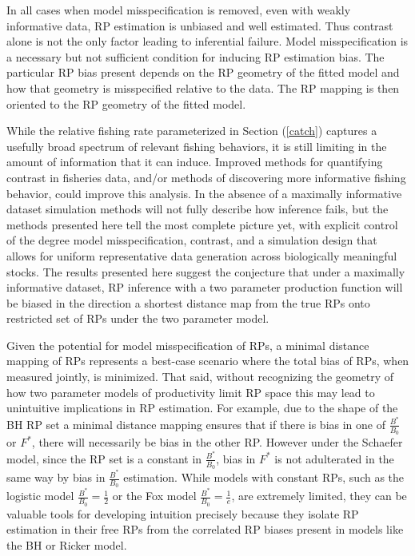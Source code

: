 %
In all cases when model misspecification is removed, even with weakly informative 
data, RP estimation is unbiased and well estimated. Thus contrast alone is 
not the only factor leading to inferential failure. Model misspecification is a 
necessary but not sufficient condition for inducing RP estimation bias. The 
particular RP bias present depends on the RP geometry of the fitted model and 
how that geometry is misspecified relative to the data. The RP mapping is then oriented 
to the RP geometry of the fitted model. 

%
While the relative fishing rate parameterized in Section (\ref{catch}) captures a usefully 
broad spectrum of relevant fishing behaviors, it is still limiting in the amount of information 
that it can induce. Improved methods for quantifying contrast in fisheries data, and/or methods of 
discovering more informative fishing behavior, could improve this analysis. In the absence of a %
maximally informative dataset simulation methods will not fully describe how 
inference fails, but the methods presented here tell the most complete picture 
yet, with explicit control of the degree model misspecification, contrast, and 
a simulation design that allows for uniform representative data generation 
across biologically meaningful stocks. The results presented here suggest the 
conjecture that under a maximally informative dataset, RP inference with a two 
parameter production function will be biased in the direction a shortest distance 
map from the true RPs onto restricted set of RPs under the two parameter model.    

%
Given the potential for model misspecification of RPs, a minimal distance 
mapping of RPs represents a best-case scenario where the total bias of RPs, 
when measured jointly, is minimized. That said, without recognizing the 
geometry of how two parameter models of productivity limit RP space this may 
lead to unintuitive implications in RP estimation. For example, due to the 
shape of the BH RP set a minimal distance mapping ensures that if there is 
bias in one of $\frac{B^*}{B_0}$ or $F^*$, there will necessarily be 
bias in the other RP. However under the Schaefer model, since the RP set is a 
constant in $\frac{B^*}{B_0}$, bias in $F^*$ is not adulterated in the 
same way by bias in $\frac{B^*}{B_0}$ estimation. While models with 
constant RPs, such as the logistic model $\frac{B^*}{B_0}=\frac{1}{2}$ or 
the Fox model $\frac{B^*}{B_0}=\frac{1}{e}$, are extremely limited, they 
can be valuable tools for developing intuition precisely because they isolate 
RP estimation in their free RPs from the correlated RP biases present in 
models like the BH or Ricker model. 

